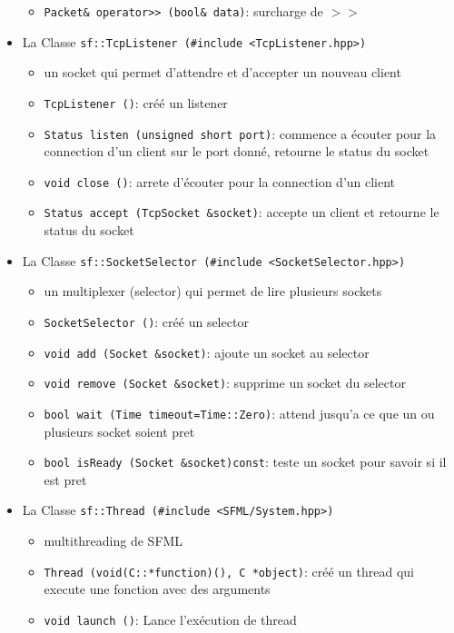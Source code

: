 \documentclass[12pt,a4paper,twoside]{article}
\begin{document}
\begin{itemize}
\begin{itemize}
            \item{} \lstinline$Packet& operator>> (bool& data)$\;: surcharge de $>>$
        \end{itemize}
        \item{} La Classe \lstinline$sf::TcpListener (#include <TcpListener.hpp>)$
        \begin{itemize}
            \item{} un socket qui permet d'attendre et d'accepter un nouveau client
            \item{} \lstinline$TcpListener ()$\;: créé un listener
            \item{} \lstinline$Status listen (unsigned short port)$\;: commence a écouter pour la connection d'un client sur le port donné, retourne le status du socket
            \item{} \lstinline$void close ()$\;: arrete d'écouter pour la connection d'un client
            \item{} \lstinline$Status accept (TcpSocket &socket)$\;: accepte un client et retourne le status du socket
        \end{itemize}
        \item{} La Classe \lstinline$sf::SocketSelector (#include <SocketSelector.hpp>)$
        \begin{itemize}
            \item{} un multiplexer (selector) qui permet de lire plusieurs sockets
            \item{} \lstinline$SocketSelector ()$\;: créé un selector
            \item{} \lstinline$void add (Socket &socket)$\;: ajoute un socket au selector
            \item{} \lstinline$void remove (Socket &socket)$\;: supprime un socket du selector
            \item{} \lstinline$bool wait (Time timeout=Time::Zero)$\;: attend jusqu'a ce que un ou plusieurs socket soient pret
            \item{} \lstinline$bool isReady (Socket &socket)const$\;: teste un socket pour savoir si il est pret
        \end{itemize}
        \item{} La Classe \lstinline$sf::Thread (#include <SFML/System.hpp>)$
        \begin{itemize}
            \item{} multithreading de SFML
            \item{} \lstinline$Thread (void(C::*function)(), C *object)$\;: créé un thread qui execute une fonction avec des arguments
            \item{} \lstinline$void launch ()$\;: Lance l'exécution de thread
        \end{itemize}
    \end{itemize}
\end{document}
